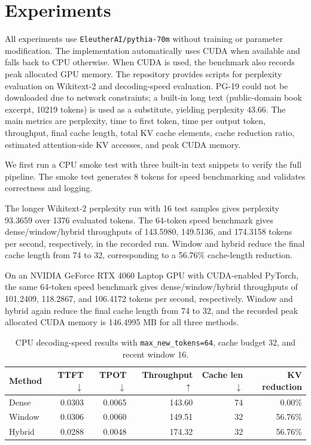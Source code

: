 \documentclass{article}
\begin{document}
\section{Experiments}
All experiments use \texttt{EleutherAI/pythia-70m} without training or parameter modification. The implementation automatically uses CUDA when available and falls back to CPU otherwise. When CUDA is used, the benchmark also records peak allocated GPU memory. The repository provides scripts for perplexity evaluation on Wikitext-2 and decoding-speed evaluation. PG-19 could not be downloaded due to network constraints; a built-in long text (public-domain book excerpt, 10219 tokens) is used as a substitute, yielding perplexity 43.66. The main metrics are perplexity, time to first token, time per output token, throughput, final cache length, total KV cache elements, cache reduction ratio, estimated attention-side KV accesses, and peak CUDA memory.

We first run a CPU smoke test with three built-in text snippets to verify the full pipeline. The smoke test generates 8 tokens for speed benchmarking and validates correctness and logging.

The longer Wikitext-2 perplexity run with 16 test samples gives perplexity 93.3659 over 1376 evaluated tokens. The 64-token speed benchmark gives dense/window/hybrid throughputs of 143.5980, 149.5136, and 174.3158 tokens per second, respectively, in the recorded run. Window and hybrid reduce the final cache length from 74 to 32, corresponding to a 56.76\% cache-length reduction.

On an NVIDIA GeForce RTX 4060 Laptop GPU with CUDA-enabled PyTorch, the same 64-token speed benchmark gives dense/window/hybrid throughputs of 101.2409, 118.2867, and 106.4172 tokens per second, respectively. Window and hybrid again reduce the final cache length from 74 to 32, and the recorded peak allocated CUDA memory is 146.4995 MB for all three methods.

\begin{table}[h]
\centering
\caption{CPU decoding-speed results with \texttt{max\_new\_tokens=64}, cache budget 32, and recent window 16.}
\begin{tabular}{lrrrrr}
\toprule
Method & TTFT $\downarrow$ & TPOT $\downarrow$ & Throughput $\uparrow$ & Cache len $\downarrow$ & KV reduction \\
\midrule
Dense & 0.0303 & 0.0065 & 143.60 & 74 & 0.00\% \\
Window & 0.0306 & 0.0060 & 149.51 & 32 & 56.76\% \\
Hybrid & 0.0288 & 0.0048 & 174.32 & 32 & 56.76\% \\
\bottomrule
\end{tabular}
\end{table}
\end{document}
